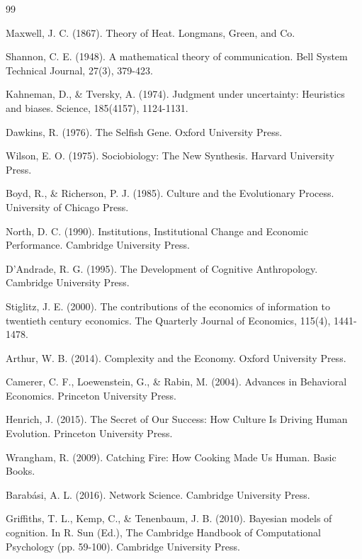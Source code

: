 \documentclass[12pt,a4paper]{article}
\begin{document}

\begin{thebibliography}{99}

Maxwell, J. C. (1867). Theory of Heat. Longmans, Green, and Co.

Shannon, C. E. (1948). A mathematical theory of communication. Bell System Technical Journal, 27(3), 379-423.

Kahneman, D., \& Tversky, A. (1974). Judgment under uncertainty: Heuristics and biases. Science, 185(4157), 1124-1131.

Dawkins, R. (1976). The Selfish Gene. Oxford University Press.

Wilson, E. O. (1975). Sociobiology: The New Synthesis. Harvard University Press.

Boyd, R., \& Richerson, P. J. (1985). Culture and the Evolutionary Process. University of Chicago Press.

North, D. C. (1990). Institutions, Institutional Change and Economic Performance. Cambridge University Press.

D'Andrade, R. G. (1995). The Development of Cognitive Anthropology. Cambridge University Press.

Stiglitz, J. E. (2000). The contributions of the economics of information to twentieth century economics. The Quarterly Journal of Economics, 115(4), 1441-1478.

Arthur, W. B. (2014). Complexity and the Economy. Oxford University Press.

Camerer, C. F., Loewenstein, G., \& Rabin, M. (2004). Advances in Behavioral Economics. Princeton University Press.

Henrich, J. (2015). The Secret of Our Success: How Culture Is Driving Human Evolution. Princeton University Press.

Wrangham, R. (2009). Catching Fire: How Cooking Made Us Human. Basic Books.

Barabási, A. L. (2016). Network Science. Cambridge University Press.

Griffiths, T. L., Kemp, C., \& Tenenbaum, J. B. (2010). Bayesian models of cognition. In R. Sun (Ed.), The Cambridge Handbook of Computational Psychology (pp. 59-100). Cambridge University Press.


\end{thebibliography}
\end{document}
